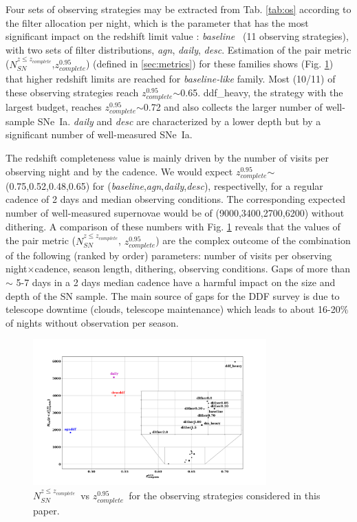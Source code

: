 \documentclass[skiphelvet,twocolumn]{aastex63}
\newcommand{\sne}{{SNe~Ia}}
\newcommand{\nsncomp}{{$N_{SN}^{z\leq z_{complete}}$}}
\newcommand{\zcompb}{\mbox{$z_{complete}^{0.95}$}}
\newcommand{\osfamily}[1]{{\it #1}}
\begin{document}
%
%
%
%
Four sets of observing strategies may be extracted from Tab. \ref{tab:os} according to the filter allocation per night, which is the parameter that has the most significant impact on the redshift limit value : \osfamily{baseline}~ (11 observing strategies), with two sets of filter distributions, \osfamily{agn}, \osfamily{daily}, \osfamily{desc}. Estimation of the pair metric (\nsncomp,\zcompb) (defined in \ref{sec:metrics}) for these families shows (Fig. \ref{fig:nsn_zlim_zoom}) that higher redshift limits are reached for \osfamily{baseline-like} family. Most (10/11) of these observing strategies reach \zcompb$\sim$0.65. ddf\_heavy, the strategy with the largest budget, reaches \zcompb$\sim$0.72 and also collects the larger number of well-sample \sne. \osfamily{daily} and \osfamily{desc} are characterized by a lower depth but by a significant number of well-measured \sne.\par
The redshift completeness value is mainly driven by the number of visits per observing night and by the cadence. We would expect \zcompb$\sim$(0.75,0.52,0.48,0.65) for (\osfamily{baseline},\osfamily{agn},\osfamily{daily},\osfamily{desc}), respectivelly, for a regular cadence of 2 days and median observing conditions. The corresponding expected number of well-measured supernovae would be of (9000,3400,2700,6200) without dithering. A comparison of these numbers with Fig. \ref{fig:nsn_zlim_zoom} reveals that the values of the pair metric (\nsncomp, \zcompb) are the complex outcome of the combination of the following (ranked by order) parameters: number of visits per observing night$\times$cadence, season length, dithering, observing conditions. Gaps of more than $\sim$ 5-7 days in a 2 days median cadence have a harmful
impact on the size and depth of the SN sample. The main source of gaps for the DDF survey is due to telescope downtime (clouds, telescope maintenance) which leads to about 16-20$\%$ of nights without observation per season.  

\begin{figure}[htbp]
\begin{center}
  \includegraphics[width=0.8\textwidth]{nsn_zlim_zoom.png}
 \caption{\nsncomp~vs \zcompb~for the observing strategies considered in this paper.}\label{fig:nsn_zlim_zoom}
\end{center}
\end{figure}
\end{document}
